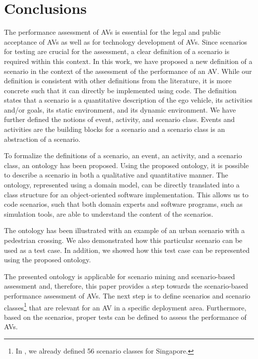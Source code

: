 \cbstart
\section{Conclusions}
\label{sec:conclusion}

The performance assessment of AVs is essential for the legal and public acceptance of AVs as well as for technology development of AVs. 
Since scenarios for testing are crucial for the assessment, a clear definition of a scenario is required within this context. 
In this work, we have proposed a new definition of a scenario in the context of the assessment of the performance of an AV. 
\cbstartc While our definition is consistent with other definitions from the literature, it is more concrete such that it can directly be implemented using code.
The definition states that a scenario is a quantitative description of the ego vehicle, its activities and/or goals, its static environment, and its dynamic environment. 
We have further defined the notions of event, activity, and scenario class. Events and activities are the building blocks for a scenario and a scenario class is an abstraction of a scenario.

To formalize the definitions of a scenario, an event, an activity, and a scenario class, an ontology has been proposed. Using the proposed ontology, it is possible to describe a scenario in both a qualitative and quantitative manner. The ontology, represented using a domain model, can be directly translated into a class structure for an object-oriented software implementation. This allows us to code scenarios, such that both domain experts and software programs, such as simulation tools, are able to understand the content of the scenarios. 

\cbstart
The ontology has been illustrated with an example of an urban scenario with a pedestrian crossing. 
We also demonstrated how this particular scenario can be used as a test case. In addition, we showed how this test case can be represented using the proposed ontology.
\cbend

The presented ontology is applicable for scenario mining and scenario-based assessment and, therefore, this paper provides a step towards the scenario-based performance assessment of AVs. The next step is to define scenarios and scenario classes\footnote{\cbstart In \cite{degelder2019scenarioclasses}, we already defined 56 scenario classes for Singapore.\cbend} that are relevant for an AV in a specific deployment area. Furthermore, based on the scenarios, proper tests can be defined to assess the performance of AVs. 
\cbend
